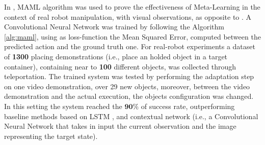 In \cite{finn2017one_shot_visual_il}, MAML algorithm was used to prove the effectiveness of Meta-Learning in the context of real robot manipulation, with visual observations, as opposite to \cite{duan2017one_shot_il}. A Convolutional Neural Network was trained by following the Algorithm \ref{alg:maml}, using as loss-function the Mean Squared Error, computed between the predicted action and the ground truth one. For real-robot experiments a dataset of \textbf{1300} placing demonstrations (i.e., place an holded object in a target container), containing near to \textbf{100} different objects, was collected through teleportation. The trained system was tested by performing the adaptation step on one video demonstration, over 29 new objects, moreover, between the video demonstration and the actual execution, the objects configuration was changed. In this setting the system reached the $\mathbf{90\%}$ of success rate, outperforming baseline methods based on LSTM \cite{duan2017one_shot_il}, and contextual network (i.e., a Convolutional Neural Network that takes in input the current observation and the image representing the target state).


